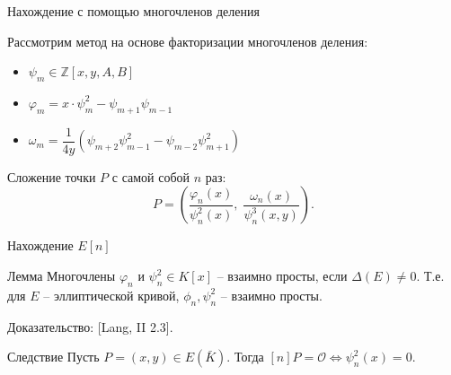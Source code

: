\documentclass{beamer}
\begin{document}
\begin{frame}{Нахождение с помощью многочленов деления}
	\vspace{1em}
	
	Рассмотрим метод на основе факторизации многочленов деления:
	
	\begin{itemize}
		\item $\psi_m \in \mathbb{Z}\left[x,y,A,B\right]$
		\item $\varphi_m = x \cdot \psi_m^2 - \psi_{m + 1} \psi_{m - 1}$
		
		\item $\omega_m = \dfrac{1}{{4y}}\left( {{\psi_{m + 2}}\psi_{m - 1}^2 - {\psi_{m - 2}}\psi_{m + 1}^2} \right)$
	\end{itemize}
	Сложение точки $P$ с самой собой $n$ раз:
	\begin{equation*}
		[n] P = \left( {\frac{{{\varphi _n}(x)}}{{\psi _n^2(x)}},\;\frac{{{\omega _n}( x )}}{{\psi _n^3(x,y)}}} \right).
	\end{equation*}
\end{frame}

\begin{frame}{Нахождение $E[n]$}
	\begin{block}{Лемма}
		Многочлены ${\varphi _n}$ и $\psi _n^2 \in K\left[ x \right]$ -- взаимно просты, если $\Delta (E) \ne 0$. Т.е. для $E$ -- эллиптической кривой, ${\phi _n}, \psi _n^2$ -- взаимно просты.
	\end{block}
	\structure{$\triangleleft$} Доказательство: [Lang, II 2.3].\structure{$\triangleright$}
	
	\vspace{1em}
	
	\begin{block}{Следствие}
		Пусть $P = (x,y) \in E(\bar{K})$. Тогда $[n] P = \mathcal{O} \Leftrightarrow \psi_n^2(x) = 0$.
	\end{block}
\end{frame}
\end{document}
